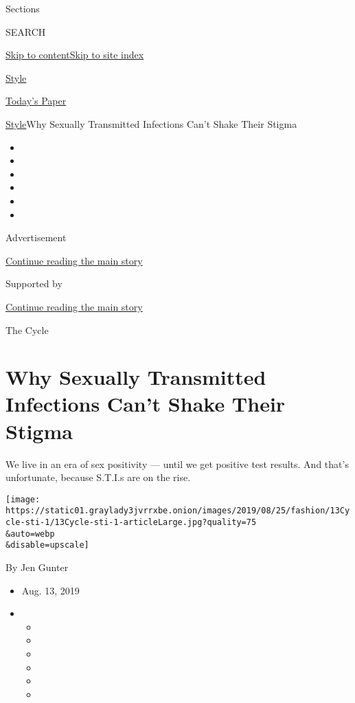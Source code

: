 Sections

SEARCH

\protect\hyperlink{site-content}{Skip to
content}\protect\hyperlink{site-index}{Skip to site index}

\href{https://www.nytimes3xbfgragh.onion/section/style}{Style}

\href{https://myaccount.nytimes3xbfgragh.onion/auth/login?response_type=cookie\&client_id=vi}{}

\href{https://www.nytimes3xbfgragh.onion/section/todayspaper}{Today's
Paper}

\href{/section/style}{Style}\textbar{}Why Sexually Transmitted
Infections Can't Shake Their Stigma

\begin{itemize}
\item
\item
\item
\item
\item
\item
\end{itemize}

Advertisement

\protect\hyperlink{after-top}{Continue reading the main story}

Supported by

\protect\hyperlink{after-sponsor}{Continue reading the main story}

The Cycle

\hypertarget{why-sexually-transmitted-infections-cant-shake-their-stigma}{%
\section{Why Sexually Transmitted Infections Can't Shake Their
Stigma}\label{why-sexually-transmitted-infections-cant-shake-their-stigma}}

We live in an era of sex positivity --- until we get positive test
results. And that's unfortunate, because S.T.I.s are on the rise.

\texttt{[image: https://static01.graylady3jvrrxbe.onion/images/2019/08/25/fashion/13Cycle-sti-1/13Cycle-sti-1-articleLarge.jpg?quality=75\\\&auto=webp\\\&disable=upscale]}

By Jen Gunter

\begin{itemize}
\item
  Aug. 13, 2019
\item
  \begin{itemize}
  \item
  \item
  \item
  \item
  \item
  \item
  \end{itemize}
\end{itemize}


